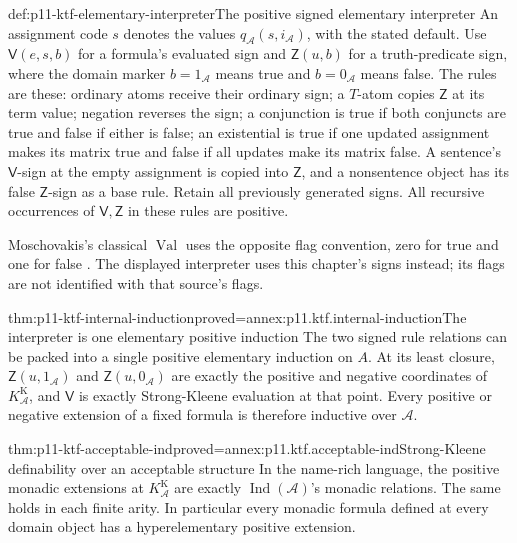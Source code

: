 \begin{hbdefinition}{def:p11-ktf-elementary-interpreter}{The positive signed elementary interpreter}
An assignment code \(s\) denotes the values
\(q_{\mathcal A}(s,i_{\mathcal A})\), with the stated default.
Use \(\mathsf V(e,s,b)\) for a formula's evaluated sign and
\(\mathsf Z(u,b)\) for a truth-predicate sign, where the domain
marker \(b=1_{\mathcal A}\) means true and \(b=0_{\mathcal A}\)
means false. The rules are these: ordinary atoms receive their ordinary
sign; a \(T\)-atom copies \(\mathsf Z\) at its term value;
negation reverses the sign; a conjunction is true if both conjuncts
are true and false if either is false; an existential is true if one
updated assignment makes its matrix true and false if all updates
make its matrix false. A sentence's \(\mathsf V\)-sign at the
empty assignment is copied into \(\mathsf Z\), and a nonsentence
object has its false \(\mathsf Z\)-sign as a base rule.
Retain all previously generated signs. All recursive occurrences of
\(\mathsf V,\mathsf Z\) in these rules are positive.

Moschovakis's classical \(\operatorname{Val}\) uses the opposite
flag convention, zero for true and one for false
\cite[5B.2]{Moschovakis1974EIASOriginal}. The displayed interpreter
uses this chapter's signs instead; its flags are not identified with
that source's flags.
\end{hbdefinition}

\begin{hblemma}{thm:p11-ktf-internal-induction}{proved=annex:p11.ktf.internal-induction}{The interpreter is one elementary positive induction}
The two signed rule relations can be packed into a single positive
elementary induction on \(A\). At its least closure,
\(\mathsf Z(u,1_{\mathcal A})\) and
\(\mathsf Z(u,0_{\mathcal A})\) are exactly the positive and
negative coordinates of \(K_{\mathcal A}^{\mathrm K}\), and
\(\mathsf V\) is exactly Strong-Kleene evaluation at that point.
Every positive or negative extension of a fixed formula is therefore
inductive over \(\mathcal A\).
\end{hblemma}

\begin{hbtheorem}{thm:p11-ktf-acceptable-ind}{proved=annex:p11.ktf.acceptable-ind}{Strong-Kleene definability over an acceptable structure}
In the name-rich language, the positive monadic extensions at
\(K_{\mathcal A}^{\mathrm K}\) are exactly
\(\operatorname{Ind}(\mathcal A)\)'s monadic relations.
The same holds in each finite arity. In particular every monadic
formula defined at every domain object has a hyperelementary positive
extension.
\end{hbtheorem}

